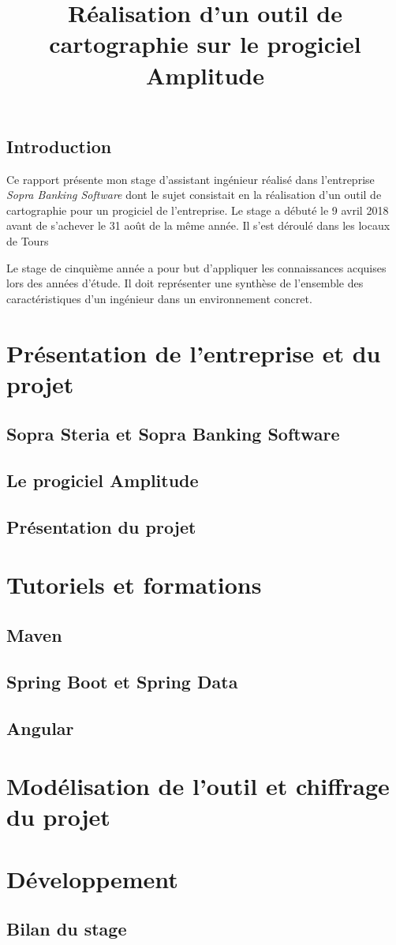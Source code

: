 \documentclass{polytech/polytech}
\title{Réalisation d'un outil de cartographie sur le progiciel Amplitude}
\begin{document}
\chapter*{Introduction}


Ce rapport présente mon stage d'assistant ingénieur réalisé dans l'entreprise \textit{Sopra Banking Software} dont le sujet consistait en la réalisation d'un outil de cartographie pour un progiciel de l'entreprise. Le stage a débuté le 9 avril 2018 avant de s'achever le 31 août de la même année. Il s'est déroulé dans les locaux de Tours

Le stage de cinquième année a pour but d'appliquer les connaissances acquises lors des années d'étude. Il doit représenter une synthèse de l'ensemble des caractéristiques d'un ingénieur dans un environnement concret. 


\part{Présentation de l'entreprise et du projet}


\chapter{Sopra Steria et Sopra Banking Software}


\chapter{Le progiciel Amplitude}


\chapter{Présentation du projet}


\part{Tutoriels et formations}


\chapter{Maven}


\chapter{Spring Boot et Spring Data}


\chapter{Angular}


\part{Modélisation de l'outil et chiffrage du projet}


\part{Développement}


\chapter{Bilan du stage}


\appendix
\end{document}
